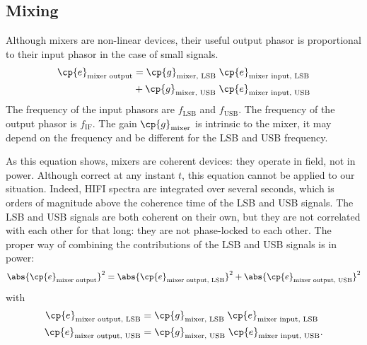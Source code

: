 \begin{refsection}

\subsection{Mixing}
Although mixers are non-linear devices, their useful output phasor is proportional to their input phasor in the case of small signals.
\begin{equation}
    \begin{aligned}
    \cp{e}_\text{mixer output}
    &=
    \cp{g}_\text{mixer, LSB} \;
    \cp{e}_\text{mixer input, LSB} \\
    &+
    \cp{g}_\text{mixer, USB} \;
    \cp{e}_\text{mixer input, USB}
    \end{aligned}
\end{equation}
The frequency of the input phasors are $f_\text{LSB}$ and $f_\text{USB}$.
The frequency of the output phasor is $f_\text{IF}$.
The gain $\cp{g}_\text{mixer}$ is intrinsic to the mixer, it may depend on the frequency and be different for the LSB and USB frequency.

As this equation shows, mixers are coherent devices: they operate in field, not in power.
Although correct at any instant $t$, this equation cannot be applied to our situation.
Indeed, HIFI spectra are integrated over several seconds, which is orders of magnitude above the coherence time of the LSB and USB signals.
The LSB and USB signals are both coherent on their own, but they are not correlated with each other for that long: they are not phase-locked to each other.
The proper way of combining the contributions of the LSB and USB signals is in power:
\begin{equation}
    \abs{\cp{e}_\text{mixer output}}^2
    =
    \abs{\cp{e}_\text{mixer output, LSB}}^2
    +
    \abs{\cp{e}_\text{mixer output, USB}}^2
\end{equation}
with
\begin{align}
    \cp{e}_\text{mixer output, LSB}
    &=
    \cp{g}_\text{mixer, LSB}
    \;
    \cp{e}_\text{mixer input, LSB}
    \\
    \cp{e}_\text{mixer output, USB}
    &=
    \cp{g}_\text{mixer, USB}
    \;
    \cp{e}_\text{mixer input, USB}
    \text{.}
\end{align}


\end{refsection}
